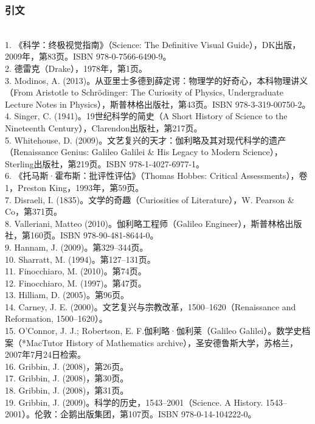 \subsubsection{引文} \\
1. 《科学：终极视觉指南》（Science: The Definitive Visual Guide），DK出版，2009年，第83页。ISBN 978-0-7566-6490-9。\\  
2. 德雷克（Drake），1978年，第1页。\\ 
3. Modinos, A. (2013)。从亚里士多德到薛定谔：物理学的好奇心，本科物理讲义（From Aristotle to Schrödinger: The Curiosity of Physics, Undergraduate Lecture Notes in Physics），斯普林格出版社，第43页。ISBN 978-3-319-00750-2。\\  
4. Singer, C. (1941)。19世纪科学的简史（A Short History of Science to the Nineteenth Century），Clarendon出版社，第217页。\\ 
5. Whitehouse, D. (2009)。文艺复兴的天才：伽利略及其对现代科学的遗产（Renaissance Genius: Galileo Galilei & His Legacy to Modern Science），Sterling出版社，第219页。ISBN 978-1-4027-6977-1。\\
6. 《托马斯·霍布斯：批评性评估》（Thomas Hobbes: Critical Assessments），卷1，Preston King，1993年，第59页。\\
7. Disraeli, I. (1835)。文学的奇趣（Curiosities of Literature），W. Pearson & Co，第371页。\\
8. Valleriani, Matteo (2010)。伽利略工程师（Galileo Engineer），斯普林格出版社，第160页。ISBN 978-90-481-8644-0。\\
9. Hannam, J. (2009)。第329–344页。\\
10. Sharratt, M. (1994)。第127–131页。\\
11. Finocchiaro, M. (2010)。第74页。\\
12. Finocchiaro, M. (1997)。第47页。\\
13. Hilliam, D. (2005)。第96页。\\
14. Carney, J. E. (2000)。文艺复兴与宗教改革，1500–1620（Renaissance and Reformation, 1500–1620）。\\  
15. O'Connor, J. J.; Robertson, E. F.伽利略·伽利莱（Galileo Galilei）。数学史档案（*MacTutor History of Mathematics archive），圣安德鲁斯大学，苏格兰，2007年7月24日检索。\\
16. Gribbin, J. (2008)，第26页。\\
17. Gribbin, J. (2008)，第30页。\\
18. Gribbin, J. (2008)，第31页。\\
19. Gribbin, J. (2009)。科学的历史，1543–2001（Science. A History. 1543–2001）。伦敦：企鹅出版集团，第107页。ISBN 978-0-14-104222-0。\\ 
